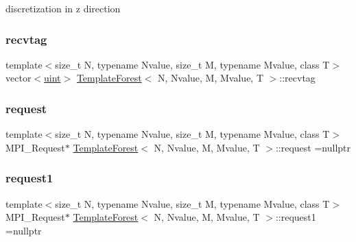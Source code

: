 discretization in z direction \mbox{\label{classTemplateForest_ab3c00d6a664a6194e6ce9c2f962feb56}} 
\subsubsection{\texorpdfstring{recvtag}{recvtag}}
{\footnotesize\ttfamily template$<$size\+\_\+t N, typename Nvalue, size\+\_\+t M, typename Mvalue, class T$>$ \\
vector$<$\mbox{\hyperlink{definitions_8h_a69aa29b598b851b0640aa225a9e5d61d}{uint}}$>$ \mbox{\hyperlink{classTemplateForest}{Template\+Forest}}$<$ N, Nvalue, M, Mvalue, T $>$\+::recvtag\hspace{0.3cm}{\ttfamily [private]}}

\mbox{\label{classTemplateForest_a0c51898863ad5472a890988d5645e2af}} 
\subsubsection{\texorpdfstring{request}{request}}
{\footnotesize\ttfamily template$<$size\+\_\+t N, typename Nvalue, size\+\_\+t M, typename Mvalue, class T$>$ \\
M\+P\+I\+\_\+\+Request$\ast$ \mbox{\hyperlink{classTemplateForest}{Template\+Forest}}$<$ N, Nvalue, M, Mvalue, T $>$\+::request =nullptr\hspace{0.3cm}{\ttfamily [private]}}

\mbox{\label{classTemplateForest_a657e34ecc155063ccced9ca4ef3ef47e}} 
\subsubsection{\texorpdfstring{request1}{request1}}
{\footnotesize\ttfamily template$<$size\+\_\+t N, typename Nvalue, size\+\_\+t M, typename Mvalue, class T$>$ \\
M\+P\+I\+\_\+\+Request$\ast$ \mbox{\hyperlink{classTemplateForest}{Template\+Forest}}$<$ N, Nvalue, M, Mvalue, T $>$\+::request1 =nullptr\hspace{0.3cm}{\ttfamily [private]}}

